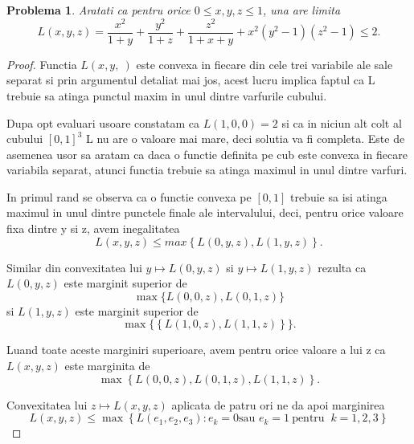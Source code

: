 \documentclass[a4paper,12pt,oneside]{report}
\newtheorem{problem}{Problema}
\begin{document}
\begin{problem}
	Aratati ca pentru orice \(0\leq x , y , z \leq 1\), una are limita
\begin{displaymath}
  L\left ( x , y , z \right ) = \frac{x^{2}}{1 + y} + \frac{y^{2}}{1 + z} + \frac{z^{2}}{1 + x+ y} + x^{2} \left ( y^{2} - 1 \right )\left ( z^{2} - 1 \right ) \leq 2.
\end{displaymath}
\end{problem}
\begin{proof}
Functia \(L\left ( x,y,\ \right )\) este convexa in fiecare din cele trei variabile ale sale separat si prin argumentul detaliat mai jos, acest lucru implica faptul ca L trebuie sa atinga punctul maxim  in unul dintre varfurile cubului.

Dupa opt evaluari usoare constatam ca \(L \left ( 1,0,0 \right ) = 2\) si ca in niciun alt colt al cubului $[0, 1]^3$ L nu are o valoare mai mare, deci solutia va fi completa. Este de asemenea usor sa aratam ca daca o functie definita pe cub este convexa in fiecare variabila separat, atunci functia trebuie sa atinga maximul in unul dintre varfuri.

In primul rand se observa ca o functie convexa pe \(\left [ 0 , 1 \right ]\) trebuie sa isi atinga maximul in unul dintre punctele finale ale intervalului, deci, pentru orice valoare fixa dintre y si z, avem inegalitatea
\begin{displaymath}
  L\left ( x,y,z \right )\leq max \left \{ L\left ( 0,y,z \right ), L\left ( 1,y,z \right ) \right \}.
\end{displaymath}

 Similar din convexitatea lui \(y \mapsto L\left ( 0,y,z \right )\) si \(y \mapsto L\left ( 1,y,z \right )\)  rezulta ca \(L\left ( 0, y, z \right )\) este marginit superior de  \[\max \{L\left ( 0,0,z \right ), L\left ( 0,1,z \right )\}\] si \( L\left ( 1,y,z \right )\) este marginit superior de \[\max \{\left \{ L\left ( 1,0,z \right ) , L \left ( 1,1,z \right )\right \}\}.\]

 Luand toate aceste marginiri superioare, avem pentru orice valoare a lui z ca \(L\left ( x,y,z \right )\) este marginita de
 \[\max\left \{ L\left ( 0,0,z \right ), L\left ( 0,1,z \right ), L\left ( 1,1,z \right ) \right \}.\]

 Convexitatea lui \(z \mapsto L\left ( x,y,z \right )\) aplicata de patru ori ne da apoi marginirea
 \begin{displaymath}
  L\left ( x,y,z \right ) \leq  \max \left \{ L\left ( e_{1} , e_{2}, e_{3}\right ): e_{k}  = 0 \text{sau } e_{k} = 1 ~\text{pentru }~ k = 1,2,3\right \}
\end{displaymath}
\end{proof}
\end{document}
